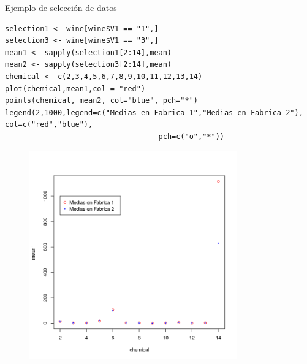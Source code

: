 \documentclass[xcolor=table]{beamer}
\begin{document}
\begin{frame}[fragile]{Ejemplo de selección de datos}
\begin{lstlisting}
selection1 <- wine[wine$V1 == "1",]
selection3 <- wine[wine$V1 == "3",]
mean1 <- sapply(selection1[2:14],mean)
mean2 <- sapply(selection3[2:14],mean)
chemical <- c(2,3,4,5,6,7,8,9,10,11,12,13,14)
plot(chemical,mean1,col = "red")
points(chemical, mean2, col="blue", pch="*")
legend(2,1000,legend=c("Medias en Fabrica 1","Medias en Fabrica 2"), col=c("red","blue"),
                                   pch=c("o","*"))
\end{lstlisting}

\begin{figure}
\centering
\includegraphics[width=0.8\textwidth]{means.png}
\end{figure}
\end{frame}
\end{document}
